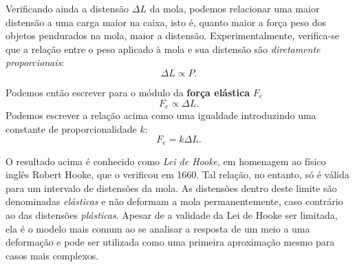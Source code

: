 Verificando ainda a distensão $\Delta L$ da mola, podemos relacionar uma maior distensão a uma carga maior na caixa, isto é, quanto maior a força peso dos objetos pendurados na mola, maior a distensão. Experimentalmente, verifica-se que a relação entre o peso aplicado à mola e sua distensão são \emph{diretamente proporcionais}:
\begin{equation}
	\Delta L \propto P.
\end{equation}

Podemos então escrever para o módulo da \textbf{força elástica} $F_e$
\begin{equation}
	F_e \propto \Delta L.
\end{equation}
%
Podemos escrever a relação acima como uma igualdade introduzindo uma constante de proporcionalidade $k$:
\begin{equation}\label{Eq:LeiDeHookeEmModulo}
	F_e = k \Delta L.
\end{equation}

O resultado acima é conhecido como \emph{Lei de Hooke}, em homenagem ao físico inglês Robert Hooke, que o verificou em 1660. Tal relação, no entanto, só é válida para um intervalo de distensões da mola. As distensões dentro deste limite são denominadas \emph{elásticas} e não deformam a mola permanentemente, caso contrário ao das distensões \emph{plásticas}. Apesar de a validade da Lei de Hooke ser limitada, ela é o modelo mais comum ao se analisar a resposta de um meio a uma deformação e pode ser utilizada como uma primeira aproximação mesmo para casos mais complexos.

